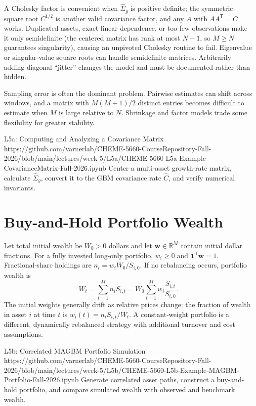 \documentclass[11pt]{article}
\newcommand{\R}{\mathbb{R}}
\begin{document}
A Cholesky factor is convenient when $\widehat\Sigma_g$ is positive definite; the symmetric square root $C^{1/2}$ is another valid covariance factor, and any $A$ with $AA^{\mathsf T}=C$ works. Duplicated assets, exact linear dependence, or too few observations make it only semidefinite (the centered matrix has rank at most $N-1$, so $M\geq N$ guarantees singularity), causing an unpivoted Cholesky routine to fail. Eigenvalue or singular-value square roots can handle semidefinite matrices. Arbitrarily adding diagonal ``jitter'' changes the model and must be documented rather than hidden.

Sampling error is often the dominant problem. Pairwise estimates can shift across windows, and a matrix with $M(M+1)/2$ distinct entries becomes difficult to estimate when $M$ is large relative to $N$. Shrinkage and factor models trade some flexibility for greater stability.

\notebooklink
  {L5a: Computing and Analyzing a Covariance Matrix}
  {https://github.com/varnerlab/CHEME-5660-CourseRepository-Fall-2026/blob/main/lectures/week-5/L5a/CHEME-5660-L5a-Example-CovarianceMatrix-Fall-2026.ipynb}
  {Center a multi-asset growth-rate matrix, calculate $\widehat\Sigma_g$, convert it to the GBM covariance rate $\widehat C$, and verify numerical invariants.}

\section{Buy-and-Hold Portfolio Wealth}

Let total initial wealth be $W_0>0$ dollars and let $\mathbf w\in\R^M$ contain initial dollar fractions. For a fully invested long-only portfolio, $w_i\geq0$ and $\mathbf1^{\mathsf T}\mathbf w=1$. Fractional-share holdings are $n_i=w_iW_0/S_{i,0}$. If no rebalancing occurs, portfolio wealth is
\begin{equation}
  \label{eq:buy-hold-wealth}
  W_t=\sum_{i=1}^{M}n_iS_{i,t}
  =W_0\sum_{i=1}^{M}w_i\frac{S_{i,t}}{S_{i,0}}.
\end{equation}
The initial weights generally drift as relative prices change: the fraction of wealth in asset $i$ at time $t$ is $w_i(t)=n_iS_{i,t}/W_t$. A constant-weight portfolio is a different, dynamically rebalanced strategy with additional turnover and cost assumptions.

\notebooklink
  {L5b: Correlated MAGBM Portfolio Simulation}
  {https://github.com/varnerlab/CHEME-5660-CourseRepository-Fall-2026/blob/main/lectures/week-5/L5b/CHEME-5660-L5b-Example-MAGBM-Portfolio-Fall-2026.ipynb}
  {Generate correlated asset paths, construct a buy-and-hold portfolio, and compare simulated wealth with observed and benchmark wealth.}
\end{document}
